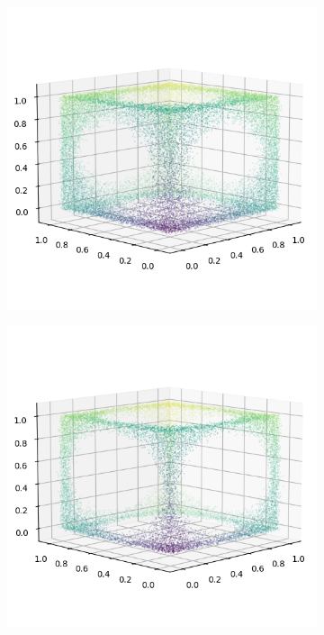 \begin{figure}[ht!]

    \centering
    \begin{subfigure}[b]{0.25\textwidth}
        \centering
        \includegraphics[width=0.9\linewidth]{python/plots/cube_points/data/matrix/cube_points_m6_n01}
    \end{subfigure}%
    \begin{subfigure}[b]{0.25\textwidth}
        \centering
        \includegraphics[width=0.9\linewidth]{python/plots/cube_points/data/matrix/cube_points_m12_n01}

\end{subfigure}
\end{figure}
